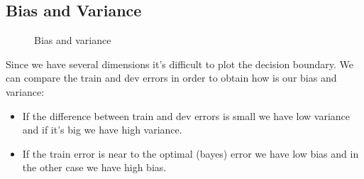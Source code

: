 \subsection*{Bias and Variance}

\begin{figure}[H]
    \caption{Bias and variance}
    \label{fig:example}
\end{figure}

Since we have several dimensions it's difficult to plot the decision boundary. We can 
compare the train and dev errors in order to obtain how is our bias and variance:

\begin{itemize}
    \item If the difference between train and dev errors is small we have low variance
    and if it's big we have high variance. 
    \item If the train error is near to the optimal (bayes) error we have low bias 
    and in the other case we have high bias.
\end{itemize}

